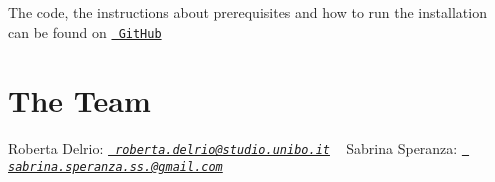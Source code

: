 The code, the instructions about prerequisites and how to run the installation can be found on \href{https://github.com/RobertaDelrio/GestureBasedControlMiro}\texttt{ Git\+Hub} \hypertarget{index_team_sec}{}\section{The Team}\label{index_team_sec}
Roberta Delrio\+: {\itshape \href{mailto:roberta.delrio@studio.unibo.it}\texttt{ roberta.\+delrio@studio.\+unibo.\+it}} ~\newline
 Sabrina Speranza\+: {\itshape \href{mailto:sabrina.speranza.ss.@gmail.com}\texttt{ sabrina.\+speranza.\+ss.@gmail.\+com}} 